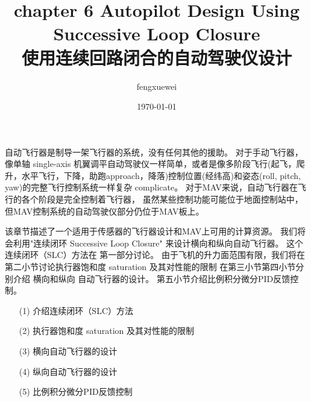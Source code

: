 \documentclass[UTF8,a4paper,10pt,nocolorlinks]{ctexart}
\title{
    \textbf{chapter 6 Autopilot Design Using Successive Loop Closure}\\
    \textbf{使用连续回路闭合的自动驾驶仪设计}
}
\author{ fengxuewei }
\date{\today}
\begin{document}
    \maketitle
    自动飞行器是制导一架飞行器的系统，没有任何其他的援助。
    对于手动飞行器，像单轴 single-axis 机翼调平自动驾驶仪一样简单，或者是像多阶段飞行(起飞，爬升，水平飞行，下降，助跑approach，降落)控制位置(经纬高)和姿态(roll, pitch, yaw)的完整飞行控制系统一样复杂 complicate。
    对于MAV来说，自动飞行器在飞行的各个阶段是完全控制着飞行器，
    虽然某些控制功能可能位于地面控制站中，但MAV控制系统的自动驾驶仪部分仍位于MAV板上。
    \par 该章节描述了一个适用于传感器的飞行器设计和MAV上可用的计算资源。
    我们将会利用"连续闭环 Successive Loop Closure" 来设计横向和纵向自动飞行器。
    这个连续闭环（SLC）方法在 第一部分讨论。
    由于飞机的升力面范围有限，我们将在第二小节讨论执行器饱和度 saturation 及其对性能的限制
    在第三小节第四小节分别介绍 横向和纵向 自动飞行器的设计。
    第五小节介绍比例积分微分PID反馈控制。
    
    \begin{itemize}
        \item[(1)] 介绍连续闭环（SLC）方法
        \item[(2)] 执行器饱和度 saturation 及其对性能的限制
        \item[(3)] 横向自动飞行器的设计
        \item[(4)] 纵向自动飞行器的设计
        \item[(5)] 比例积分微分PID反馈控制
    \end{itemize}
    \clearpage

    \setcounter{page}{1}        %
\end{document}
